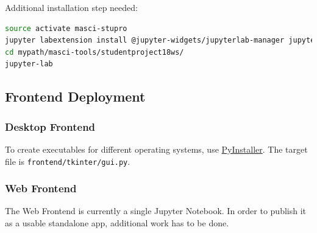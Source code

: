 Additional installation step needed:

\begin{lstlisting}[language=bash, style=code]
source activate masci-stupro
jupyter labextension install @jupyter-widgets/jupyterlab-manager jupyter-matplotlib ipyvolume
cd mypath/masci-tools/studentproject18ws/
jupyter-lab
\end{lstlisting}

\subsection{Frontend Deployment}\label{frontend-deployment}

\subsubsection{Desktop Frontend}\label{desktop-frontend-1}

To create executables for different operating systems, use
\href{https://www.pyinstaller.org/}{PyInstaller}. The target file is
\texttt{frontend/tkinter/gui.py}.

\subsubsection{Web Frontend}\label{web-frontend-1}

The Web Frontend is currently a single Jupyter Notebook. In order to
publish it as a usable standalone app, additional work has to be done.

